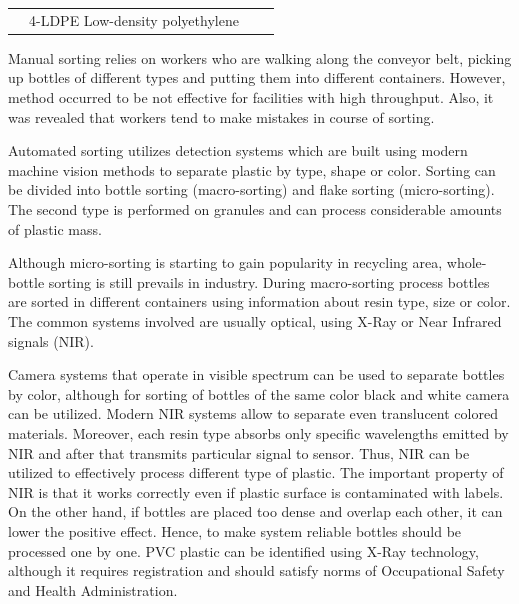 \documentclass{lutmscthesis}[2010/09/22]
\begin{document}
\begin{table}[hpt]
\begin{center}
{\begin{tabular}{C{2cm} | l | C{2cm} | l}
& 4-LDPE Low-density polyethylene &
& \\

\end{tabular}}
\end{center}
\end{table}


Manual sorting relies on workers who are walking along the
conveyor belt, picking up bottles of different types and
putting them into different containers. However, method occurred
to be not effective for facilities with high throughput.
Also, it was revealed that workers tend to make mistakes
in course of sorting.

Automated sorting utilizes detection systems which are built
using modern machine vision methods to separate plastic by type,
shape or color. Sorting can be divided into bottle sorting (macro-sorting)
and flake sorting (micro-sorting). The second type is performed on granules
and can process considerable amounts of plastic mass.

Although micro-sorting is starting to gain
popularity in recycling area, whole-bottle sorting
is still prevails in industry. During macro-sorting
process bottles are sorted in different containers
using information about resin type, size or color.
The common systems involved are usually optical, using
X-Ray or Near Infrared signals (NIR).

Camera systems that operate in visible spectrum
can be used to separate bottles by color, although for
sorting of bottles of the same color black and white
camera can be utilized. Modern NIR systems
allow to separate even translucent colored materials.
Moreover, each resin type absorbs only specific wavelengths
emitted by NIR and after that transmits particular signal
to sensor. Thus, NIR can be utilized to effectively
process different type of plastic. The important property
of NIR is that it works correctly even if plastic surface
is contaminated with labels. On the other hand, if bottles
are placed too dense and overlap each other, it can lower
the positive effect. Hence, to make system reliable
bottles should be processed one by one. PVC plastic can
be identified using X-Ray technology, although it requires
registration and should satisfy norms of Occupational Safety
and Health Administration.
\end{document}
